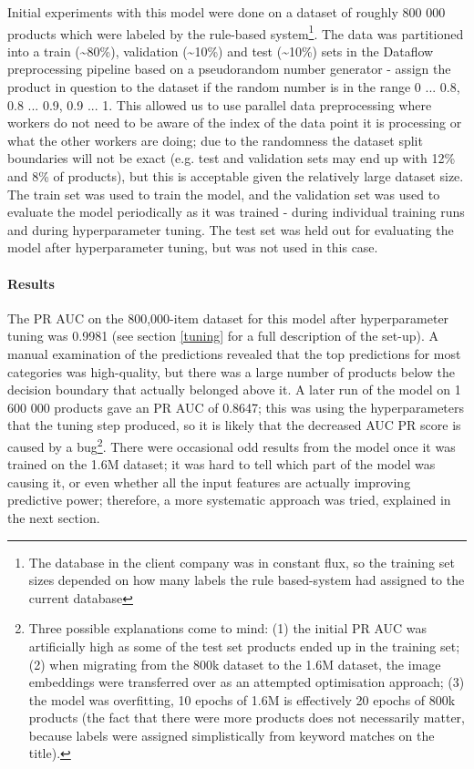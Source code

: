 Initial experiments with this model were done on a dataset of roughly 800 000 products which were labeled by the rule-based system\footnote{The database in the client company was in constant flux, so the training set sizes depended on how many labels the rule based-system had assigned to the current database}.
The data was partitioned into a train (\textasciitilde80\%), validation (\textasciitilde10\%) and test (\textasciitilde10\%) sets in the Dataflow preprocessing pipeline based on a pseudorandom number generator - assign the product in question to the dataset if the random number is in the range 0 ... 0.8, 0.8 ... 0.9, 0.9 ... 1.
This allowed us to use parallel data preprocessing where workers do not need to be aware of the index of the data point it is processing or what the other workers are doing; due to the randomness the dataset split boundaries will not be exact (e.g. test and validation sets may end up with 12\% and 8\% of products), but this is acceptable given the relatively large dataset size.
The train set was used to train the model, and the validation set was used to evaluate the model periodically as it was trained - during individual training runs and during hyperparameter tuning.
The test set was held out for evaluating the model after hyperparameter tuning, but was not used in this case.

\paragraph{Results}
The PR AUC on the 800,000-item dataset for this model after hyperparameter tuning was 0.9981 (see section \ref{tuning} for a full description of the set-up).
A manual examination of the predictions revealed that the top predictions for most categories was high-quality, but there was a large number of products below the decision boundary that actually belonged above it.
A later run of the model on 1 600 000 products gave an PR AUC of 0.8647; this was using the hyperparameters that the tuning step produced, so it is likely that the decreased AUC PR score is caused by a bug\footnote{Three possible explanations come to mind: (1) the initial PR AUC was artificially high as some of the test set products ended up in the training set; (2) when migrating from the 800k dataset to the 1.6M dataset, the image embeddings were transferred over as an attempted optimisation approach; (3) the model was overfitting, 10 epochs of 1.6M is effectively 20 epochs of 800k products (the fact that there were more products does not necessarily matter, because labels were assigned simplistically from keyword matches on the title).}.
There were occasional odd results from the model once it was trained on the 1.6M dataset; it was hard to tell which part of the model was causing it, or even whether all the input features are actually improving predictive power; therefore, a more systematic approach was tried, explained in the next section.

